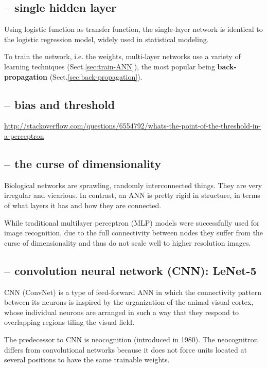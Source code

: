 \subsection{-- single hidden layer}

Using logistic function as transfer function, the single-layer network is
identical to the logistic regression model, widely used in statistical modeling. 
  
To train the network, i.e. the weights, multi-layer networks use a variety of
learning techniques (Sect.\ref{sec:train-ANN}), the most popular being {\bf
back-propagation} (Sect.\ref{sec:back-propagation}).

\subsection{-- bias and threshold}

\url{http://stackoverflow.com/questions/6554792/whats-the-point-of-the-threshold-in-a-perceptron}

\subsection{-- the curse of dimensionality}

Biological networks are sprawling, randomly interconnected things. They are very
irregular and vicarious. In contrast, an ANN is pretty rigid in structure, in
terms of what layers it has and how they are connected.

While traditional multilayer perceptron (MLP) models were successfully used for
image recognition, due to the full connectivity between nodes they suffer from
the curse of dimensionality and thus do not scale well to higher resolution
images.


\subsection{-- convolution neural network (CNN): LeNet-5}
\label{sec:LeNet-5}
\label{sec:CNN}


CNN (ConvNet) is a type of feed-forward ANN in which the connectivity pattern
between its neurons is inspired by the organization of the animal visual cortex,
whose individual neurons are arranged in such a way that they respond to
overlapping regions tiling the visual field.

The predecessor to CNN is neocognition (introduced in 1980).
The neocognitron differs from convolutional networks because it does not force
units located at several positions to have the same trainable weights.

